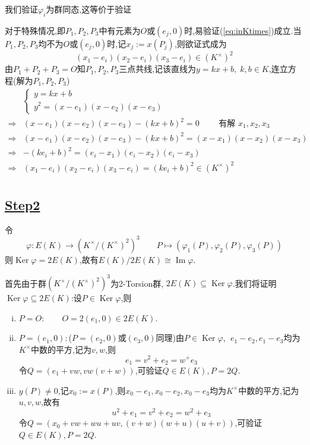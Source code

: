 \documentclass[12pt,A4paper,oneside,reqno]{amsart}
\numberwithin{equation}{section}
\theoremstyle{definition}
\theoremstyle{plain}
\theoremstyle{plain}
\numberwithin{equation}{section}
\theoremstyle{remark}
\DeclareMathOperator{\Ker}{\operatorname{Ker}}
\DeclareMathOperator{\Img}{\operatorname{Im}}
\begin{document}
我们验证$\varphi_i$为群同态,这等价于验证
\begin{center}
\end{center}
对于特殊情况,即$P_1,P_2,P_3$中有元素为$O$或$(e_j,0)$时,易验证(\ref{eq:inKtimes})成立.当$P_1,P_2,P_3$均不为$O$或$(e_j,0)$时,记$x_j:=x(P_j)$,则欲证式成为
$$(x_1-e_i)(x_2-e_i)(x_3-e_i) \in (K^{\times})^2$$
由$P_1+P_2+P_3=O$知$P_1,P_2,P_3$三点共线,记该直线为$y=kx+b,\;k,b \in K$,连立方程(解为$P_1,P_2,P_3$)
\begin{equation*}
\begin{aligned}
&\begin{cases}
y=kx+b\\
y^2=(x-e_1)(x-e_2)(x-e_3)
\end{cases}\\
\Longrightarrow&(x-e_1)(x-e_2)(x-e_3)-(kx+b)^2=0 \qquad\text{ 有解 }x_1,x_2,x_3\\
\Longrightarrow&(x-e_1)(x-e_2)(x-e_3)-(kx+b)^2=(x-x_1)(x-x_2)(x-x_3)\\
\Longrightarrow&-(ke_i+b)^2=(e_i-x_1)(e_i-x_2)(e_i-x_3)\\
\Longrightarrow&(x_1-e_i)(x_2-e_i)(x_3-e_i)=(ke_i+b)^2 \in (K^{\times})^2\\
\end{aligned}
\end{equation*}
\subsection*{\underline{Step2}}
令
$$\varphi:E(K) \longrightarrow (K^{\times}/(K^{\times})^2)^3 \qquad P \longmapsto (\varphi_1(P),\varphi_2(P),\varphi_3(P))$$
则$\Ker \varphi =2E(K)$,故有$E(K)/2E(K) \cong \Img \varphi$.

首先由于群$(K^{\times}/(K^{\times})^2)^3$为2-Torsion群, $2E(K) \subseteq \Ker \varphi$.我们将证明$\Ker \varphi \subseteq 2E(K)$:设$P \in \Ker \varphi$,则
\begin{enumerate}[(i)]
	\item $P=O:\qquad O=2(e_1,0) \in 2E(K)$.
	\item $P=(e_1,0):$($P=(e_2,0)$或$(e_3,0)$同理)由$P \in \Ker \varphi$, $\;e_1-e_2,e_1-e_3$均为$K^{\times}$中数的平方,记为$v,w$,则
	$$e_1=v^2+e_2=w^+e_3$$
	令$Q=(e_1+vw,vw(v+w))$,可验证$Q \in E(K), P=2Q$.
	\item $y(P) \neq 0$,记$x_0:=x(P)$,则$x_0-e_1,x_0-e_2,x_0-e_3$均为$K^{\times}$中数的平方,记为$u,v,w$,故有
	$$u^2+e_1=v^2+e_2=w^2+e_3$$
	令$Q=(x_0+vw+wu+uv,(v+w)(w+u)(u+v))$,可验证$Q \in E(K), P=2Q$.
\end{enumerate}
\end{document}
